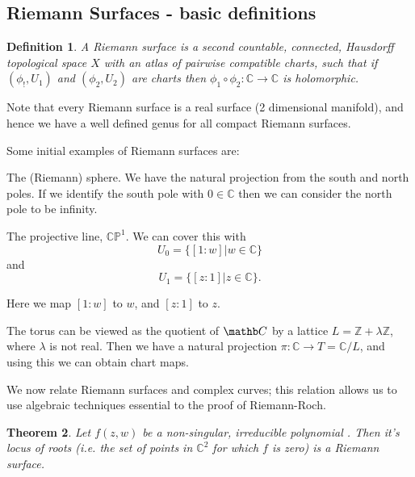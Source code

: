 \documentclass[draft, 11pt]{article} %
\title{}
\author{Joe Tait}
\theoremstyle{plain}
\newtheorem{defn}{Definition}[section]
\newtheorem{thm}[defn]{Theorem}
\theoremstyle{remark}
\begin{document}
\maketitle
\thispagestyle{empty}
\newpage
\subsection{Riemann Surfaces - basic definitions}

\begin{defn} A Riemann surface is a second countable, connected, Hausdorff topological space $X$ with an atlas of pairwise compatible charts, such that if $(\phi_!,U_1)$ and $(\phi_2,U_2)$ are charts then $\phi_1\circ \phi_2:\mathbb C \rightarrow \mathbb C$ is holomorphic.
\end{defn}

Note that every Riemann surface is a real surface (2 dimensional manifold), and hence we have a well defined genus for all compact Riemann surfaces.

Some initial examples of Riemann surfaces are:
\begin{list}
 \item The (Riemann) sphere. We have the natural projection from the south and north poles. If we identify the south pole with $0\in \mathbb C$ then we can consider the north pole to be infinity.

\item The projective line, $\mathbb{CP}^1$. We can cover this with 
\[
	U_0 = \{[1:w]|w\in \mathbb C\}
\]
and
\[
	U_1 = \{[z:1]|z\in \mathbb C\}.
\]

Here we map $[1:w]$ to $w$, and $[z:1]$ to $z$.

\item The torus can be viewed as the quotient of $\mathb C$ by a lattice $L=\mathbb Z + \lambda \mathbb Z$, where $\lambda$ is not real.
Then we have a natural projection $\pi : \mathbb C \rightarrow T = \mathbb C/L$, and using this we can obtain chart maps.
\end{list}

We now relate Riemann surfaces and complex curves; this relation allows us to use algebraic techniques essential to the proof of Riemann-Roch.

\begin{thm} 
Let $f(z,w)$ be a non-singular, irreducible polynomial .
Then it's locus of roots (i.e. the set of points in $\mathbb C^2$ for which $f$ is zero) is a Riemann surface.
\end{thm}
\end{document}
